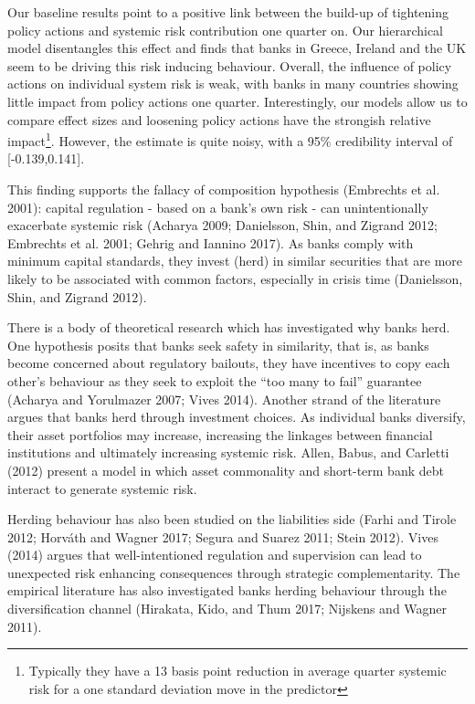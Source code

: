 \documentclass[
  10pt,
]{article}
\begin{document}
Our baseline results point to a positive link between the build-up of
tightening policy actions and systemic risk contribution one quarter on.
Our hierarchical model disentangles this effect and finds that banks in
Greece, Ireland and the UK seem to be driving this risk inducing
behaviour. Overall, the influence of policy actions on individual system
risk is weak, with banks in many countries showing little impact from
policy actions one quarter. Interestingly, our models allow us to
compare effect sizes and loosening policy actions have the strongish
relative impact\footnote{Typically they have a 13 basis point reduction
  in average quarter systemic risk for a one standard deviation move in
  the predictor}. However, the estimate is quite noisy, with a 95\%
credibility interval of {[}-0.139,0.141{]}.

This finding supports the fallacy of composition hypothesis (Embrechts
et al. 2001): capital regulation - based on a bank's own risk - can
unintentionally exacerbate systemic risk (Acharya 2009; Danielsson,
Shin, and Zigrand 2012; Embrechts et al. 2001; Gehrig and Iannino 2017).
As banks comply with minimum capital standards, they invest (herd) in
similar securities that are more likely to be associated with common
factors, especially in crisis time (Danielsson, Shin, and Zigrand 2012).

There is a body of theoretical research which has investigated why banks
herd. One hypothesis posits that banks seek safety in similarity, that
is, as banks become concerned about regulatory bailouts, they have
incentives to copy each other's behaviour as they seek to exploit the
``too many to fail'' guarantee (Acharya and Yorulmazer 2007; Vives
2014). Another strand of the literature argues that banks herd through
investment choices. As individual banks diversify, their asset
portfolios may increase, increasing the linkages between financial
institutions and ultimately increasing systemic risk. Allen, Babus, and
Carletti (2012) present a model in which asset commonality and
short-term bank debt interact to generate systemic risk.

Herding behaviour has also been studied on the liabilities side (Farhi
and Tirole 2012; Horváth and Wagner 2017; Segura and Suarez 2011; Stein
2012). Vives (2014) argues that well-intentioned regulation and
supervision can lead to unexpected risk enhancing consequences through
strategic complementarity. The empirical literature has also
investigated banks herding behaviour through the diversification channel
(Hirakata, Kido, and Thum 2017; Nijskens and Wagner 2011).
\end{document}
